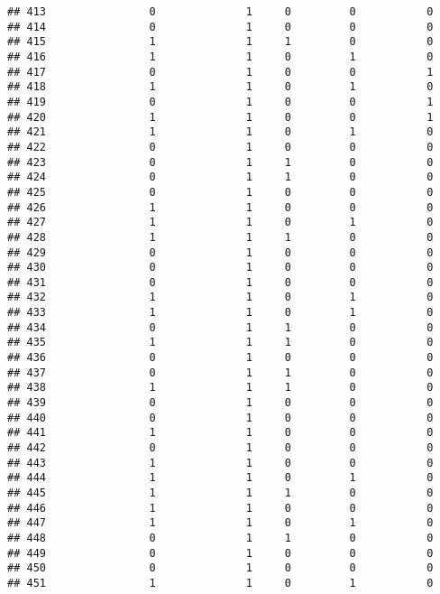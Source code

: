 \documentclass[]{article}
\begin{document}
\begin{verbatim}
## 413                0              1     0         0           0
## 414                0              1     0         0           0
## 415                1              1     1         0           0
## 416                1              1     0         1           0
## 417                0              1     0         0           1
## 418                1              1     0         1           0
## 419                0              1     0         0           1
## 420                1              1     0         0           1
## 421                1              1     0         1           0
## 422                0              1     0         0           0
## 423                0              1     1         0           0
## 424                0              1     1         0           0
## 425                0              1     0         0           0
## 426                1              1     0         0           0
## 427                1              1     0         1           0
## 428                1              1     1         0           0
## 429                0              1     0         0           0
## 430                0              1     0         0           0
## 431                0              1     0         0           0
## 432                1              1     0         1           0
## 433                1              1     0         1           0
## 434                0              1     1         0           0
## 435                1              1     1         0           0
## 436                0              1     0         0           0
## 437                0              1     1         0           0
## 438                1              1     1         0           0
## 439                0              1     0         0           0
## 440                0              1     0         0           0
## 441                1              1     0         0           0
## 442                0              1     0         0           0
## 443                1              1     0         0           0
## 444                1              1     0         1           0
## 445                1              1     1         0           0
## 446                1              1     0         0           0
## 447                1              1     0         1           0
## 448                0              1     1         0           0
## 449                0              1     0         0           0
## 450                0              1     0         0           0
## 451                1              1     0         1           0

\end{verbatim}
\end{document}
